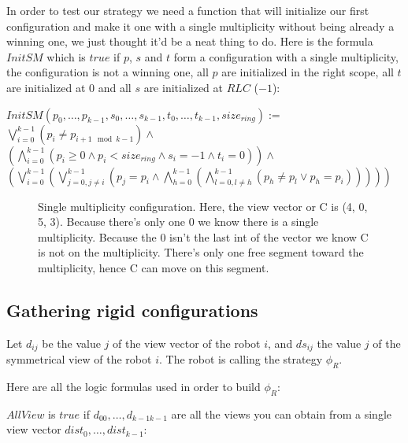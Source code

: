 \documentclass{article}
\begin{document}
In order to test our strategy we need a function that will initialize our first configuration and make it one with a single multiplicity without being already a winning one, we just thought it'd be a neat thing to do. Here is the formula $InitSM$ which is $true$ if $p$, $s$ and $t$ form a configuration with a single multiplicity, the configuration is not a winning one, all $p$ are initialized in the right scope, all $t$ are initialized at $0$ and all $s$ are initialized at $RLC$  ($-1$):

\begin{center}
    
$InitSM (p_{0},\dots, p_{k-1}, s_{0}, \dots, s_{k-1}, t_{0}, \dots, t_{k-1}, size_{ring}):=$\\
$\bigvee_{i = 0}^{k-1} ( p_{i} \not= p_{i+1 \mod{k-1}} ) \land$\\
$ (\bigwedge_{i = 0}^{k-1}  ( p_{i} \geq 0 \land p_{i} <  size_{ring} \land s_{i} = -1 \land t_{i} = 0)) \land$\\
$ (\bigvee_{i = 0}^{k-1}  (\bigvee_{j = 0, j\not=i}^{k-1}  (p_{j} = p_{i} \land \bigwedge_{h = 0}^{k-1}  ( \bigwedge_{l = 0, l\not=h}^{k-1}  (p_{h} \not= p_{l} \lor p_{h} = p_{i}) ) ) ) )$
\end{center}

\begin{figure}[!hp]
    \centering
    \def\svgscale{0.3}
    
    \caption{Single multiplicity configuration. Here, the view vector or C is  (4, 0, 5, 3). Because there's only one 0 we know there is a single multiplicity. Because the 0 isn't the last int of the vector we know C is not on the multiplicity. There's only one free segment toward the multiplicity, hence C can move on this segment.}
    \label{dessinSM}
\end{figure}

\subsection{Gathering rigid configurations}

Let $d_{ij}$ be the value $j$ of the view vector of the robot $i$, and $ds_{ij}$ the value $j$ of the symmetrical 
view of the robot $i$.
The robot is calling the strategy $\phi_R$.

Here are all the logic formulas used in order to build $\phi_R$:\newline


$AllView$ is $true$ if $d_{00}, \ldots ,d_{k-1k-1}$ are all the views you can obtain from a single view vector $dist_{0}, \ldots ,dist_{k-1}$:
\end{document}
